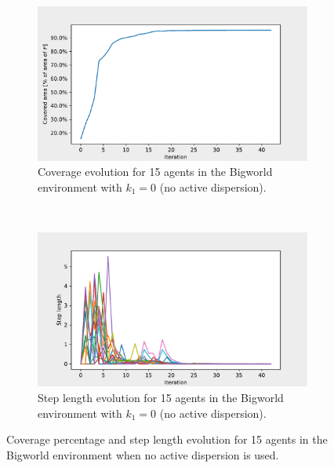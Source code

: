 \begin{figure}[H]
  \centering
  \begin{subfigure}[t]{0.5\textwidth}
    \centering
    \includegraphics[width=\textwidth]{figs/bigworld_15_agnt_k_1_0_k_2_1_area_traj.pdf}
    \caption{Coverage evolution for 15 agents in the Bigworld environment with $k_{1} = 0$ (no active dispersion).}
    \label{fig:15_agnt_bw_k_1_0_a_traj}
  \end{subfigure}%
  ~ 
  \begin{subfigure}[t]{0.5\textwidth}
    \centering
    \includegraphics[width=\textwidth]{figs/bigworld_15_agnt_k_1_0_k_2_1_step_traj.pdf}
    \caption{Step length evolution for 15 agents in the Bigworld environment with $k_{1} = 0$ (no active dispersion).}
    \label{fig:15_agnt_bw_k_1_0_s_traj}
  \end{subfigure}
  \caption{Coverage percentage and step length evolution for 15 agents in the Bigworld environment when no active dispersion is used.}
  \label{fig:15_agnt_bw_evolution}
\end{figure}


